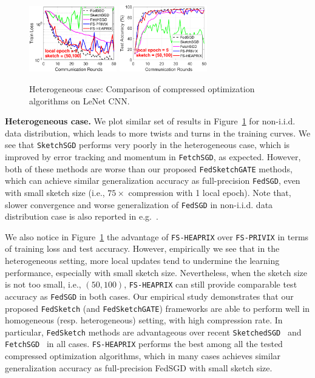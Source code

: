 \documentclass[11pt]{article}
\begin{document}
\begin{figure}[t]
\begin{center}
{		\includegraphics[width=1.5in]{MNIST_figures/local5_sketch50_iid0_train_loss.eps}\hspace{-0.12in}
		\includegraphics[width=1.5in]{MNIST_figures/local5_sketch50_iid0_test_acc.eps}
		}
	\end{center}
	\vspace{-0.1in}
	\caption{Heterogeneous case: Comparison of compressed optimization algorithms on LeNet CNN.}
    \label{fig:MNIST-iid0}
    \vspace{-0.1in}
\end{figure}

\textbf{Heterogeneous case.} We plot similar set of results in Figure~\ref{fig:MNIST-iid0} for non-i.i.d. data distribution, which leads to more twists and turns in the training curves. 
We see that \texttt{SketchSGD} performs very poorly in the heterogeneous case, which is improved by error tracking and momentum in \texttt{FetchSGD}, as expected. However, both of these methods are worse than our proposed \texttt{FedSketchGATE} methods, which can achieve similar generalization accuracy as full-precision \texttt{FedSGD}, even with small sketch size (i.e., $75\times$ compression with 1 local epoch). 
Note that, slower convergence and worse generalization of \texttt{FedSGD} in non-i.i.d. data distribution case is also reported in e.g.~\citet{mcmahan2016communication,chen2020toward}. 

We also notice in Figure~\ref{fig:MNIST-iid0} the advantage of \texttt{FS-HEAPRIX} over \texttt{FS-PRIVIX} in terms of training loss and test accuracy. 
However, empirically we see that in the heterogeneous setting, more local updates tend to undermine the learning performance, especially with small sketch size.  
Nevertheless, when the sketch size is not too small, i.e., $(50,100)$, \texttt{FS-HEAPRIX} can still provide comparable test accuracy as \texttt{FedSGD} in both cases.
Our empirical study demonstrates that our proposed \texttt{FedSketch} (and \texttt{FedSketchGATE}) frameworks are able to perform well in homogeneous (resp. heterogeneous) setting, with high compression rate. 
In particular, \texttt{FedSketch} methods are advantageous over recent \texttt{SketchedSGD}~\citep{ivkin2019communication} and \texttt{FetchSGD}~\cite{rothchild2020fetchsgd} in all cases. 
\texttt{FS-HEAPRIX} performs the best among all the tested compressed optimization algorithms, which in many cases achieves similar generalization accuracy as full-precision FedSGD with small sketch size. 
\end{document}
